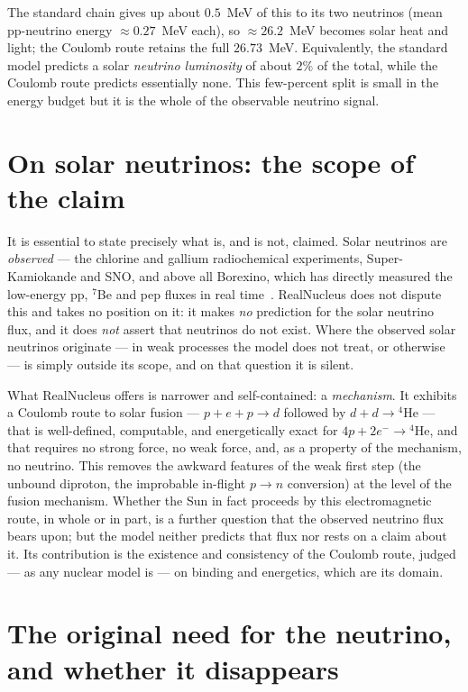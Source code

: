\documentclass[11pt]{article}
\begin{document}
The standard chain gives up about $0.5$~MeV of this to its two neutrinos (mean pp-neutrino energy
$\approx 0.27$~MeV each), so $\approx 26.2$~MeV becomes solar heat and light; the Coulomb route retains
the full $26.73$~MeV. Equivalently, the standard model predicts a solar \emph{neutrino luminosity} of
about $2\%$ of the total, while the Coulomb route predicts essentially none. This few-percent split is
small in the energy budget but it is the whole of the observable neutrino signal.

\section{On solar neutrinos: the scope of the claim}
\label{sec:test}

It is essential to state precisely what is, and is not, claimed. Solar neutrinos are \emph{observed} ---
the chlorine and gallium radiochemical experiments, Super-Kamiokande and SNO, and above all Borexino,
which has directly measured the low-energy pp, ${}^7$Be and pep fluxes in real
time~\cite{Borexino,SNO,Adelberger}. RealNucleus does not dispute this and takes no position on it: it
makes \emph{no} prediction for the solar neutrino flux, and it does \emph{not} assert that neutrinos do
not exist. Where the observed solar neutrinos originate --- in weak processes the model does not treat,
or otherwise --- is simply outside its scope, and on that question it is silent.

What RealNucleus offers is narrower and self-contained: a \emph{mechanism}. It exhibits a Coulomb route
to solar fusion --- $p+e+p\to d$ followed by $d+d\to{}^4\mathrm{He}$ --- that is well-defined,
computable, and energetically exact for $4p+2e^-\to{}^4\mathrm{He}$, and that requires no strong force,
no weak force, and, as a property of the mechanism, no neutrino. This removes the awkward features of
the weak first step (the unbound diproton, the improbable in-flight $p\to n$ conversion) at the level of
the fusion mechanism. Whether the Sun in fact proceeds by this electromagnetic route, in whole or in
part, is a further question that the observed neutrino flux bears upon; but the model neither predicts
that flux nor rests on a claim about it. Its contribution is the existence and consistency of the
Coulomb route, judged --- as any nuclear model is --- on binding and energetics, which are its domain.

\section{The original need for the neutrino, and whether it disappears}
\end{document}

